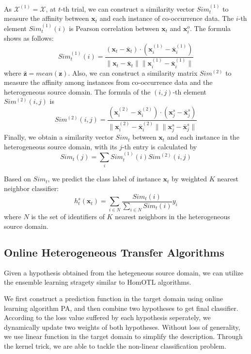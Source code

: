 \documentclass[letterpaper]{article}
\theoremstyle{remark}
\theoremstyle{definition}
\begin{document}
As $\mathcal{X}^{(1)} = \mathcal{X}$, at $t$-th trial, we can construct a similarity vector $Sim_{t}^{(1)}$ to measure the affinity between $\mathbf{x}_t$ and each instance of co-occurrence data. 
The $i$-th element $Sim_{t}^{(1)}(i)$ is Pearson correlation between $\mathbf{x}_t$ and $\mathbf{x}_{i}^{o}$.
The formula shows as follows:
$$ Sim_{t}^{(1)}(i) = \frac{(\mathbf{x}_t - \bar{\mathbf{x}}_t) \cdot (\mathbf{x}_{i}^{(1)} - \bar{\mathbf{x}}_{i}^{(1)})}{\| \mathbf{x}_t - \bar{\mathbf{x}}_t \| \| \mathbf{x}_{i}^{(1)} - \bar{\mathbf{x}}_{i}^{(1)} \|} $$
where $\bar{\mathbf{z}} = mean(\mathbf{z})$.
Also, we can construct a similarity matrix $Sim^{(2)}$ to measure the affinity among instances from co-occurrence data and the heterogeneous source domain.
The formula of the $(i,j)$-th element $Sim^{(2)}(i,j)$ is
$$ Sim^{(2)}(i,j) = \frac{(\mathbf{x}_{i}^{(2)} - \bar{\mathbf{x}}_{i}^{(2)}) \cdot (\mathbf{x}_{j}^{s} - \bar{\mathbf{x}}_{j}^{s})}{\| \mathbf{x}_{i}^{(2)} - \bar{\mathbf{x}}_{i}^{(2)} \| \| \mathbf{x}_{j}^{s} - \bar{\mathbf{x}}_{j}^{s} \|} $$
Finally, we obtain a similarity vector $Sim_t$ between $\mathbf{x}_t$ and each instance in the heterogeneous source domain, with its $j$-th entry is calculated by 
$$ Sim_t(j) = \sum\limits_i Sim_{t}^{(1)}(i) Sim^{(2)}(i,j) $$

Based on $Sim_t$, we predict the class label of instance $\mathbf{x}_t$ by weighted $K$ nearest neighbor classifier:
$$ h_{t}^{s}(\mathbf{x}_t) = \sum\limits_{i \in N} \frac{Sim_t(i)}{\sum\limits_{i \in N} Sim_t(i)} y_i $$
where $N$ is the set of identifiers of $K$ nearest neighbors in the heterogeneous source domain.

\subsection{Online Heterogeneous Transfer Algorithms}

Given a hypothesis obtained from the hetegeneous source domain, we can utilize the ensemble learning stragety similar to HomOTL algorithms.

We first construct a prediction function in the target domain using online learning algorithm PA, and then combine two hypotheses to get final classifier.
According to the loss value suffered by each hypothesis seperately, we dynamically update two weights of both hypotheses.
Without loss of generality, we use linear function in the target domain to simplify the description.
Through the kernel trick, we are able to tackle the non-linear classification problem.
\end{document}
